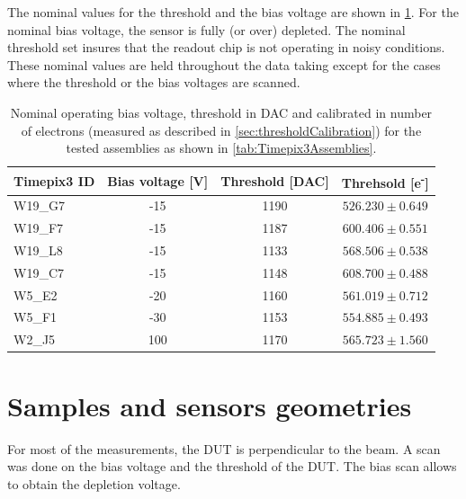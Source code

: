 The nominal values for the threshold and the bias voltage are shown in
\cref{tab:nominalBiasThreshold}. For the nominal bias voltage, the
sensor is fully (or over) depleted. The nominal threshold set insures
that the readout chip is not operating in noisy conditions. These
nominal values are held throughout the data taking except for the
cases where the threshold or the bias voltages are scanned.

\begin{table}[htbp]
  \centering
  \caption{Nominal operating bias voltage, threshold in DAC and
    calibrated in number of electrons (measured as described in
    \cref{sec:thresholdCalibration}) for the tested assemblies as
    shown in \cref{tab:Timepix3Assemblies}.}
  \label{tab:nominalBiasThreshold}
  \begin{tabular}{lccc}
    \toprule
    Timepix3 ID & Bias voltage [V] & Threshold [DAC] & Threhsold [e\textsuperscript{-}]\\
    \midrule
    W19\_G7 & -15 & 1190 & $526.230\pm0.649$ \\
    W19\_F7 & -15 & 1187 & $600.406\pm0.551$ \\
    W19\_L8 & -15 & 1133 & $568.506\pm0.538$ \\
    W19\_C7 & -15 & 1148 & $608.700\pm0.488$ \\ \hline
    W5\_E2 & -20 & 1160 & $561.019\pm0.712$ \\ \hline
    W5\_F1 & -30 & 1153 & $554.885\pm0.493$ \\ \hline
    W2\_J5 & 100 & 1170 & $565.723\pm1.560$ \\
    \bottomrule
  \end{tabular}
\end{table}

\section{Samples and sensors geometries}


 For most of the measurements, the DUT is perpendicular to the beam. A
 scan was done on the bias voltage and the threshold of the DUT. The
 bias scan allows to obtain the depletion voltage.

